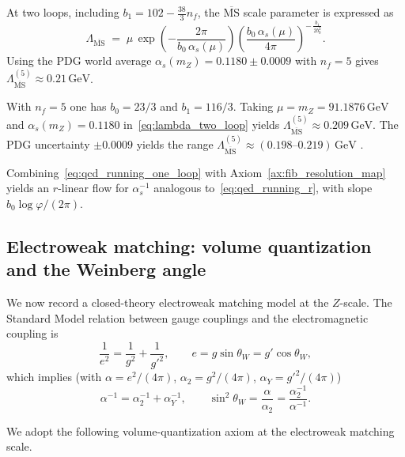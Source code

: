 At two loops, including $b_1=102-\frac{38}{3}n_f$, the $\overline{\mathrm{MS}}$ scale parameter is expressed as \cite{PeskinSchroeder1995,PDGRPP2024}
\begin{equation}\label{eq:lambda_two_loop}
\Lambda_{\overline{\mathrm{MS}}}
\;=\;
\mu\,
\exp\!\left(-\frac{2\pi}{b_0\,\alpha_s(\mu)}\right)
\left(\frac{b_0\,\alpha_s(\mu)}{4\pi}\right)^{-\,\frac{b_1}{2b_0^2}}.
\end{equation}
Using the PDG world average $\alpha_s(m_Z)=0.1180\pm 0.0009$ \cite{PDGRPP2024} with $n_f=5$ gives $\Lambda_{\overline{\mathrm{MS}}}^{(5)}\approx 0.21\,\mathrm{GeV}$.

With $n_f=5$ one has $b_0=23/3$ and $b_1=116/3$. Taking $\mu=m_Z=91.1876\,\mathrm{GeV}$ and $\alpha_s(m_Z)=0.1180$ in~\eqref{eq:lambda_two_loop} yields $\Lambda_{\overline{\mathrm{MS}}}^{(5)}\approx 0.209\,\mathrm{GeV}$. The PDG uncertainty $\pm 0.0009$ yields the range $\Lambda_{\overline{\mathrm{MS}}}^{(5)}\approx (0.198\text{--}0.219)\,\mathrm{GeV}$ \cite{PDGRPP2024}.

Combining~\eqref{eq:qcd_running_one_loop} with Axiom~\ref{ax:fib_resolution_map} yields an $r$-linear flow for $\alpha_s^{-1}$ analogous to~\eqref{eq:qed_running_r}, with slope $b_0\log\varphi/(2\pi)$.

\subsection{Electroweak matching: volume quantization and the Weinberg angle}
We now record a closed-theory electroweak matching model at the $Z$-scale. The Standard Model relation between gauge couplings and the electromagnetic coupling is \cite{Glashow1961,Weinberg1967,Salam1968,PeskinSchroeder1995}
\begin{equation}\label{eq:ew_parallel}
\frac{1}{e^2}=\frac{1}{g^2}+\frac{1}{g'^2},
\qquad
e=g\sin\theta_W=g'\cos\theta_W,
\end{equation}
which implies (with $\alpha=e^2/(4\pi)$, $\alpha_2=g^2/(4\pi)$, $\alpha_Y=g'^2/(4\pi)$)
\begin{equation}\label{eq:ew_alpha_relations}
\alpha^{-1}=\alpha_2^{-1}+\alpha_Y^{-1},
\qquad
\sin^2\theta_W=\frac{\alpha}{\alpha_2}=\frac{\alpha_2^{-1}}{\alpha^{-1}}.
\end{equation}

We adopt the following volume-quantization axiom at the electroweak matching scale.

